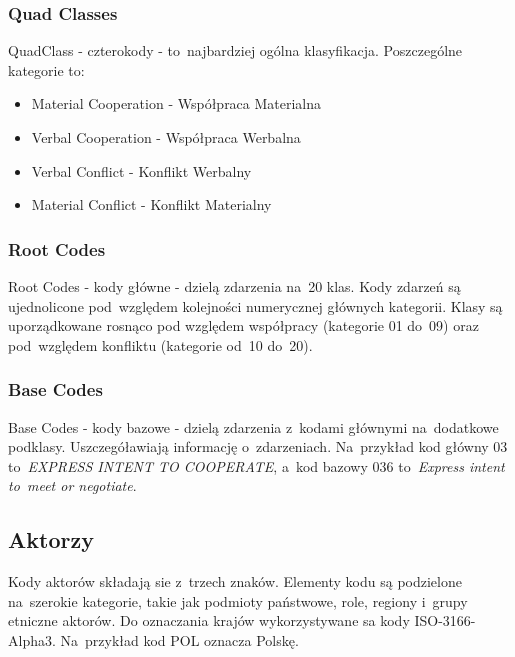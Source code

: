 \documentclass[11pt]{report}
\begin{document}
    \subsubsection{Quad Classes}
    QuadClass - czterokody - to~najbardziej ogólna klasyfikacja.
    Poszczególne kategorie to:
    \begin{itemize}
        \item Material Cooperation - Współpraca Materialna
        \item Verbal Cooperation - Współpraca Werbalna
        \item Verbal Conflict - Konflikt Werbalny
        \item Material Conflict - Konflikt Materialny
    \end{itemize}

    \subsubsection{Root Codes}
    Root Codes - kody główne - dzielą zdarzenia na~20 klas.
    Kody zdarzeń są ujednolicone pod~względem kolejności numerycznej głównych kategorii.
    Klasy są uporządkowane rosnąco pod względem współpracy (kategorie 01 do~09) oraz pod~względem konfliktu
    (kategorie od~10 do~20).

    \subsubsection{Base Codes}
    Base Codes - kody bazowe - dzielą zdarzenia z~kodami głównymi na~dodatkowe podklasy.
    Uszczegóławiają informację o~zdarzeniach.
    Na~przykład kod główny 03 to~\textit{EXPRESS INTENT TO COOPERATE},
    a~kod bazowy 036 to~\textit{Express intent to~meet or negotiate}.

    \subsection{Aktorzy}
    Kody aktorów składają sie z~trzech znaków.
    Elementy kodu są podzielone na~szerokie kategorie, takie jak podmioty państwowe, role, regiony i~grupy etniczne aktorów.
    Do oznaczania krajów wykorzystywane sa kody ISO-3166-Alpha3.
    Na~przykład kod POL oznacza Polskę.
\end{document}
